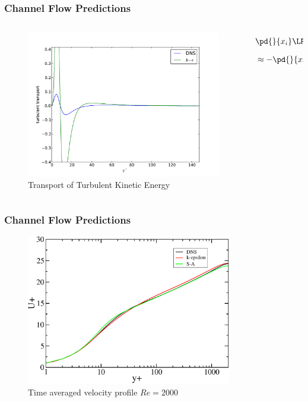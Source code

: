 \documentclass{beamer}
\begin{document}
\begin{frame}\frametitle{Channel Flow Predictions}
\begin{columns}[c]
\begin{column}{0.7\textwidth}
\begin{figure}[t]
	\begin{center}
		\includegraphics[width=\textwidth]{Transport.pdf}
	\end{center}
	\caption{Transport of Turbulent Kinetic Energy}
\end{figure}
\end{column}
\hspace{-3em}
\begin{column}{0.3\textwidth}
\begin{align*}
&\pd{}{x_i}\LRp{\frac{1}{2}\overline{u_k'u_k'u_i'}+\overline{p'u_i'}}\\
&\approx-\pd{}{x_i}\LRp{\frac{\nu_T}{\sigma_k}\pd{k}{x_i}}
\end{align*}
\end{column}
\end{columns}
\end{frame}

\begin{frame}\frametitle{Channel Flow Predictions}
\begin{figure}[t]
  \begin{center}
    \includegraphics[width=0.8\textwidth]{Mean2000.pdf}
  \end{center}
  \caption{Time averaged velocity profile $Re=2000$}
\end{figure}
\end{frame}
\end{document}
